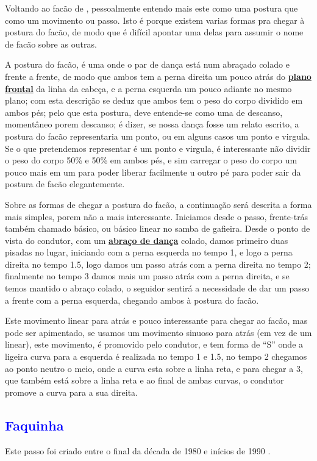 Voltando ao facão de \AnoLivro, pessoalmente entendo mais este como uma postura que 
como um movimento ou passo. Isto é porque existem varias formas pra chegar à postura do facão,
de modo que é difícil apontar uma delas para assumir o nome de facão sobre as outras.

A postura do facão, é uma onde o par de dança está num abraçado colado e frente a frente, 
de modo que ambos tem a perna direita um pouco atrás do \hyperref[def:PlanoFrontal]{\textbf{plano frontal}} da linha da cabeça,
e a perna esquerda um pouco adiante no mesmo plano; com esta descrição se deduz 
que ambos tem o peso do corpo dividido em ambos pés; pelo que esta postura,
deve entende-se como uma de descanso, momentâneo porem descanso;
é dizer, se nossa dança fosse um relato escrito, a postura do facão
representaria um ponto, ou em alguns casos um ponto e virgula.
Se o que pretendemos representar é um ponto e virgula, 
é interessante não dividir o peso do corpo 50\% e 50\% em ambos pés,
e sim carregar o peso do corpo um pouco mais em um 
para poder liberar facilmente u outro pé para poder sair da postura de facão elegantemente.  

Sobre as formas de chegar a postura do facão, a continuação será descrita a forma mais simples,
porem não a mais interessante. Iniciamos desde o passo, frente-trás também chamado básico, 
ou básico linear no samba de gafieira. Desde o ponto de vista do condutor, 
com um \hyperref[def:abracodedanca]{\textbf{abraço de dança}} colado,
damos primeiro duas pisadas no lugar, iniciando com a perna esquerda no tempo 1, e logo a perna direita no tempo 1.5,
logo damos um passo atrás com a perna direita no tempo 2; 
finalmente no tempo 3 damos mais um passo atrás com a perna direita, 
e se temos mantido o abraço colado, o seguidor sentirá a necessidade de dar um passo a frente com a perna esquerda,
chegando ambos à postura do facão.  

Este movimento linear para atrás e pouco interessante para chegar ao facão, mas pode ser apimentado,
se usamos um movimento sinuoso para atrás (em vez de um linear), este movimento,
é promovido pelo condutor, e tem forma de ``S'' onde a ligeira curva para a esquerda é realizada no tempo 1 e 1.5,
no tempo  2 chegamos ao ponto neutro o meio, onde a curva esta sobre a linha reta, e para chegar a 3, 
que também está sobre a linha reta e ao final de ambas curvas,
o condutor promove a curva para a sua direita.

\subsection{\textcolor{blue}{Faquinha}} 
Este passo foi  criado entre o final da década de 1980 e inícios de 1990  \cite[pp. 143]{perna2002samba}.

